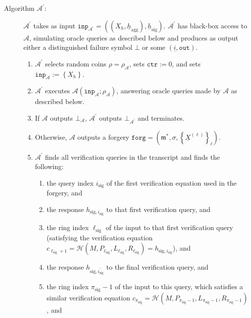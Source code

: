\documentclass{iacrtrans}
\theoremstyle{definition}
\numberwithin{theorem}{subsection}
\numberwithin{lemma}{theorem}
\newcommand{\adversary}{\mathcal{A}}
\newcommand{\m}{\mathfrak{m}}
\begin{document}
\begin{description}
\item [Algorithm $\adversary^\prime$:] $\adversary^\prime$ takes as input $\texttt{inp}_{\adversary^\prime} = ((X_h, \underline{h}_{\text{agg}}), \underline{h}_{\text{sig}})$. $\adversary^\prime$ has black-box access to $\adversary$, simulating oracle queries as described below and produces as output either a distinguished failure symbol $\bot$ or some $(\underline{i}, \texttt{out})$. 
\begin{enumerate}
\item $\adversary^\prime$ selects random coins $\rho = \rho_\adversary$, sets $\texttt{ctr}:=0$, and sets $\texttt{inp}_\adversary := \left\{X_h\right\}$.

\item $\adversary^\prime$ executes $\adversary(\texttt{inp}_\adversary; \rho_\adversary)$, answering oracle queries made by $\adversary$ as described below.

\item If $\adversary$ outputs $\bot_\adversary$, $\adversary^\prime$ outputs $\bot_{\adversary^\prime}$ and terminates. 

\item Otherwise, $\adversary$ outputs a forgery $\texttt{forg} = (\m^*, \sigma, \left\{\underline{X}^{(\ell)}\right\}_{\ell})$. 

\item $\adversary^\prime$ finds all verification queries in the transcript and finds the following:
\begin{enumerate} 
\item the query index $i_{\text{sig}}$  of the first verification equation used in the forgery, and

\item the response $h_{\text{sig},i_{\text{sig}}}$ to that first verification query, and

\item the ring index $\ell_{\text{sig}}$ of the input to that first verification query (satisfying the verification equation $c_{\ell_{\text{sig}}+1} = \mathcal{H}(M, P_{\ell_{\text{sig}}}, L_{\ell_{\text{sig}}}, R_{\ell_{\text{sig}}}) = h_{\text{sig}, i_{\text{sig}}}$), and

\item the response $h_{\text{sig}, i_{\text{sig}}^\prime}$ to the final verification query, and

\item the ring index $\pi_{\text{sig}}-1$ of the input to this query, which satisfies a similar verification equation $c_{\pi_{\text{sig}}} = \mathcal{H}(M, P_{\pi_{\text{sig}}-1}, L_{\pi_{\text{sig}} -1}, R_{\pi_{\text{sig}} - 1})$, and


\end{enumerate}
\end{enumerate}
\end{description}
\end{document}
